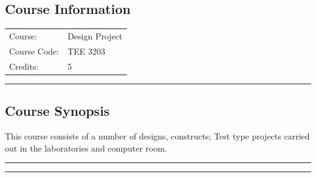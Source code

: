 
\subsection*{Course Information}
\vspace{0ex}%
\noindent\parbox{0.5\textwidth}{%
    \noindent\begin{tabular}{@{}ll}
                 \textsf{Course:}          & 	Design Project \\
                 \textsf{Course Code:}         & 	TEE 3203 \\
                 \textsf{Credits:}    & 	5
    \end{tabular}}
\vspace{2ex}\hrule\vspace{2ex}


\subsection*{Course Synopsis}
This course consists of a number of designs, constructs; Test type projects carried out in the laboratories and computer room.
\vspace{2ex}\hrule
\vspace{2ex}\hrule\vspace{2ex}